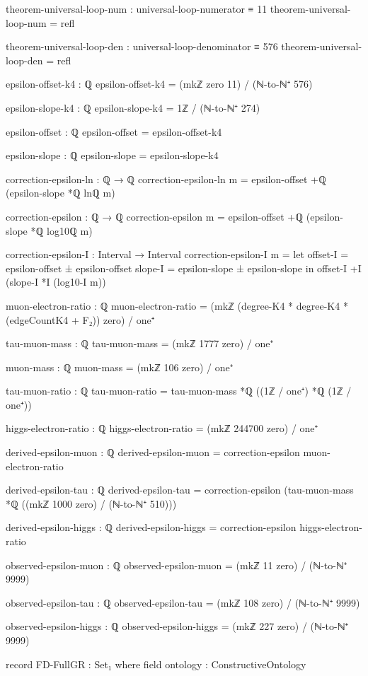 \documentclass[11pt,a4paper]{book}
\begin{document}
\begin{code}
theorem-universal-loop-num : universal-loop-numerator ≡ 11
theorem-universal-loop-num = refl

theorem-universal-loop-den : universal-loop-denominator ≡ 576
theorem-universal-loop-den = refl

epsilon-offset-k4 : ℚ
epsilon-offset-k4 = (mkℤ zero 11) / (ℕ-to-ℕ⁺ 576)

epsilon-slope-k4 : ℚ
epsilon-slope-k4 = 1ℤ / (ℕ-to-ℕ⁺ 274)

epsilon-offset : ℚ
epsilon-offset = epsilon-offset-k4

epsilon-slope : ℚ  
epsilon-slope = epsilon-slope-k4

correction-epsilon-ln : ℚ → ℚ
correction-epsilon-ln m = epsilon-offset +ℚ (epsilon-slope *ℚ lnℚ m)

correction-epsilon : ℚ → ℚ
correction-epsilon m = epsilon-offset +ℚ (epsilon-slope *ℚ log10ℚ m)

correction-epsilon-I : Interval → Interval
correction-epsilon-I m = 
  let offset-I = epsilon-offset ± epsilon-offset
      slope-I  = epsilon-slope ± epsilon-slope
  in offset-I +I (slope-I *I (log10-I m))

muon-electron-ratio : ℚ
muon-electron-ratio = (mkℤ (degree-K4 * degree-K4 * (edgeCountK4 + F₂)) zero) / one⁺

tau-muon-mass : ℚ
tau-muon-mass = (mkℤ 1777 zero) / one⁺

muon-mass : ℚ
muon-mass = (mkℤ 106 zero) / one⁺

tau-muon-ratio : ℚ
tau-muon-ratio = tau-muon-mass *ℚ ((1ℤ / one⁺) *ℚ (1ℤ / one⁺))

higgs-electron-ratio : ℚ
higgs-electron-ratio = (mkℤ 244700 zero) / one⁺

derived-epsilon-muon : ℚ
derived-epsilon-muon = correction-epsilon muon-electron-ratio

derived-epsilon-tau : ℚ
derived-epsilon-tau = correction-epsilon (tau-muon-mass *ℚ ((mkℤ 1000 zero) / (ℕ-to-ℕ⁺ 510)))

derived-epsilon-higgs : ℚ
derived-epsilon-higgs = correction-epsilon higgs-electron-ratio

observed-epsilon-muon : ℚ
observed-epsilon-muon = (mkℤ 11 zero) / (ℕ-to-ℕ⁺ 9999)

observed-epsilon-tau : ℚ
observed-epsilon-tau = (mkℤ 108 zero) / (ℕ-to-ℕ⁺ 9999)

observed-epsilon-higgs : ℚ
observed-epsilon-higgs = (mkℤ 227 zero) / (ℕ-to-ℕ⁺ 9999)

record FD-FullGR : Set₁ where
  field
    ontology          : ConstructiveOntology
    

\end{code}
\end{document}
